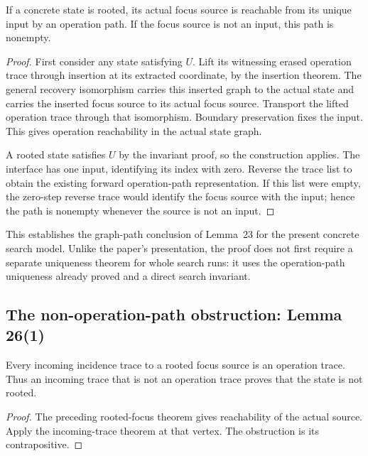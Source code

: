 \begin{theorem}
If a concrete state is rooted, its actual focus source is reachable from
its unique input by an operation path. If the focus source is not an input,
this path is nonempty.
\end{theorem}
\begin{proof}
First consider any state satisfying $U$. Lift its witnessing erased operation
trace through insertion at its extracted coordinate, by the insertion theorem.
The general recovery isomorphism carries this inserted graph to the actual
state and carries the inserted focus source to its actual focus source.
Transport the lifted operation trace through that isomorphism. Boundary
preservation fixes the input. This gives operation reachability in the actual
state graph.

A rooted state satisfies $U$ by the invariant proof, so the construction applies.
The interface has one input, identifying its index with zero. Reverse the trace
list to obtain the existing forward operation-path representation. If this
list were empty, the zero-step reverse trace would identify the focus source
with the input; hence the path is nonempty whenever the source is not an input.
\end{proof}
This establishes the graph-path conclusion of Lemma~23 for the present concrete
search model. Unlike the paper's presentation, the proof does not first require
a separate uniqueness theorem for whole search runs: it uses the operation-path
uniqueness already proved and a direct search invariant.

\subsection{The non-operation-path obstruction: Lemma 26(1)}
\label{sec:rooted-path-obstruction}
\begin{theorem}
Every incoming incidence trace to a rooted focus source is an operation trace.
Thus an incoming trace that is not an operation trace proves that the state
is not rooted.
\end{theorem}
\begin{proof}
The preceding rooted-focus theorem gives reachability of the actual source.
Apply the incoming-trace theorem at that vertex. The obstruction is its
contrapositive.
\end{proof}


